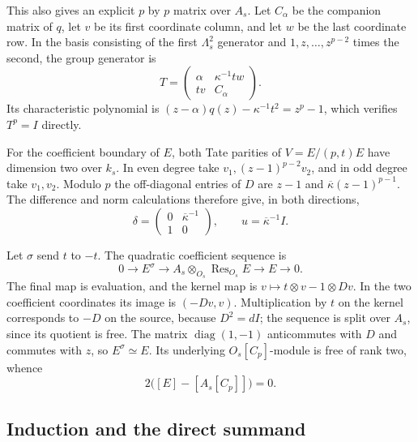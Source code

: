 This also gives an explicit $p$ by $p$ matrix over $A_s$.
Let $C_\alpha$ be the companion matrix of $q$, let $v$ be its first
coordinate column, and let $w$ be the last coordinate row.  In the
basis consisting of the first $\Lambda_s^2$ generator and
$1,z,\ldots,z^{p-2}$ times the second, the group generator is
\begin{equation}\label{eq:order-T-matrix}
 T=\begin{pmatrix}
       \alpha&\kappa^{-1}t w\\
       t v&C_\alpha
    \end{pmatrix}.
\end{equation}
Its characteristic polynomial is
$(z-\alpha)q(z)-\kappa^{-1}t^2=z^p-1$, which verifies $T^p=I$ directly.

For the coefficient boundary of $E$, both Tate parities of
$V=E/(p,t)E$ have dimension two over $k_s$.  In even degree take
$v_1,(z-1)^{p-2}v_2$, and in odd degree take $v_1,v_2$.
Modulo $p$ the off-diagonal entries of $D$ are
$z-1$ and $\overline\kappa(z-1)^{p-1}$.  The difference and norm
calculations therefore give, in both directions,
\[
 \delta=\begin{pmatrix}0&\overline\kappa^{-1}\\1&0\end{pmatrix},
 \qquad u=\overline\kappa^{-1}I.
\]

Let $\sigma$ send $t$ to $-t$.  The quadratic coefficient sequence is
\begin{equation}\label{eq:order-sign-sequence}
 0\longrightarrow E^\sigma\longrightarrow
 A_s\otimes_{O_s}\operatorname{Res}_{O_s}E
 \longrightarrow E\longrightarrow0.
\end{equation}
The final map is evaluation, and the kernel map is
$v\mapsto t\otimes v-1\otimes Dv$.
In the two coefficient coordinates its image is $(-Dv,v)$.
Multiplication by $t$ on the kernel corresponds to $-D$ on the source,
because $D^2=dI$; the sequence is split over $A_s$, since its quotient
is free.  The matrix $\operatorname{diag}(1,-1)$ anticommutes with
$D$ and commutes with $z$, so $E^\sigma\simeq E$.
Its underlying $O_s[C_p]$-module is free of rank two, whence
\begin{equation}\label{eq:order-exact-two}
 2\bigl([E]-[A_s[C_p]]\bigr)=0.
\end{equation}

\subsection{Induction and the direct summand}

